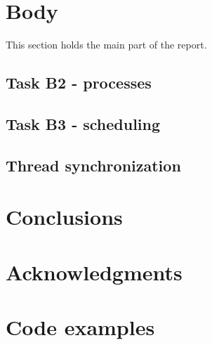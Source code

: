 \documentclass{acm_proc_article-sp}
\begin{document}
\section{Body}
This section holds the main part of the report.



\subsection{Task B2 - processes}


\subsection{Task B3 - scheduling}


\subsection{Thread synchronization}


\section{Conclusions}


\section{Acknowledgments}






\nocite{*}
%
%
\appendix



\section{Code examples}
\end{document}
